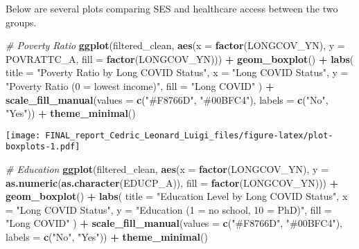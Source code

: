 \documentclass[
]{article}
\newenvironment{Shaded}{\begin{snugshade}}{\end{snugshade}}
\newcommand{\AttributeTok}[1]{\textcolor[rgb]{0.13,0.29,0.53}{#1}}
\newcommand{\CommentTok}[1]{\textcolor[rgb]{0.56,0.35,0.01}{\textit{#1}}}
\newcommand{\FunctionTok}[1]{\textcolor[rgb]{0.13,0.29,0.53}{\textbf{#1}}}
\newcommand{\NormalTok}[1]{#1}
\newcommand{\SpecialCharTok}[1]{\textcolor[rgb]{0.81,0.36,0.00}{\textbf{#1}}}
\newcommand{\StringTok}[1]{\textcolor[rgb]{0.31,0.60,0.02}{#1}}
\begin{document}
Below are several plots comparing SES and healthcare access between the
two groups.

\begin{Shaded}
\begin{Highlighting}[]
\CommentTok{\# Poverty Ratio}
\FunctionTok{ggplot}\NormalTok{(filtered\_clean, }\FunctionTok{aes}\NormalTok{(}\AttributeTok{x =} \FunctionTok{factor}\NormalTok{(LONGCOV\_YN), }\AttributeTok{y =}\NormalTok{ POVRATTC\_A, }\AttributeTok{fill =} \FunctionTok{factor}\NormalTok{(LONGCOV\_YN))) }\SpecialCharTok{+}
  \FunctionTok{geom\_boxplot}\NormalTok{() }\SpecialCharTok{+}
  \FunctionTok{labs}\NormalTok{(}
    \AttributeTok{title =} \StringTok{"Poverty Ratio by Long COVID Status"}\NormalTok{,}
    \AttributeTok{x =} \StringTok{"Long COVID Status"}\NormalTok{,}
    \AttributeTok{y =} \StringTok{"Poverty Ratio (0 = lowest income)"}\NormalTok{,}
    \AttributeTok{fill =} \StringTok{"Long COVID"}
\NormalTok{  ) }\SpecialCharTok{+}
  \FunctionTok{scale\_fill\_manual}\NormalTok{(}\AttributeTok{values =} \FunctionTok{c}\NormalTok{(}\StringTok{"\#F8766D"}\NormalTok{, }\StringTok{"\#00BFC4"}\NormalTok{), }\AttributeTok{labels =} \FunctionTok{c}\NormalTok{(}\StringTok{"No"}\NormalTok{, }\StringTok{"Yes"}\NormalTok{)) }\SpecialCharTok{+}
  \FunctionTok{theme\_minimal}\NormalTok{()}
\end{Highlighting}
\end{Shaded}

\texttt{[image: FINAL\_report\_Cedric\_Leonard\_Luigi\_files/figure-latex/plot-boxplots-1.pdf]}

\begin{Shaded}
\begin{Highlighting}[]
\CommentTok{\# Education}
\FunctionTok{ggplot}\NormalTok{(filtered\_clean, }\FunctionTok{aes}\NormalTok{(}\AttributeTok{x =} \FunctionTok{factor}\NormalTok{(LONGCOV\_YN), }\AttributeTok{y =} \FunctionTok{as.numeric}\NormalTok{(}\FunctionTok{as.character}\NormalTok{(EDUCP\_A)), }\AttributeTok{fill =} \FunctionTok{factor}\NormalTok{(LONGCOV\_YN))) }\SpecialCharTok{+}
  \FunctionTok{geom\_boxplot}\NormalTok{() }\SpecialCharTok{+}
  \FunctionTok{labs}\NormalTok{(}
    \AttributeTok{title =} \StringTok{"Education Level by Long COVID Status"}\NormalTok{,}
    \AttributeTok{x =} \StringTok{"Long COVID Status"}\NormalTok{,}
    \AttributeTok{y =} \StringTok{"Education (1 = no school, 10 = PhD)"}\NormalTok{,}
    \AttributeTok{fill =} \StringTok{"Long COVID"}
\NormalTok{  ) }\SpecialCharTok{+}
  \FunctionTok{scale\_fill\_manual}\NormalTok{(}\AttributeTok{values =} \FunctionTok{c}\NormalTok{(}\StringTok{"\#F8766D"}\NormalTok{, }\StringTok{"\#00BFC4"}\NormalTok{), }\AttributeTok{labels =} \FunctionTok{c}\NormalTok{(}\StringTok{"No"}\NormalTok{, }\StringTok{"Yes"}\NormalTok{)) }\SpecialCharTok{+}
  \FunctionTok{theme\_minimal}\NormalTok{()}
\end{Highlighting}
\end{Shaded}
\end{document}
